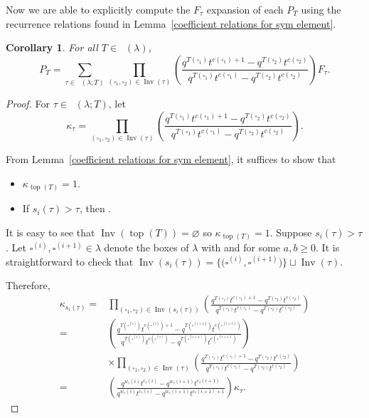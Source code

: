 \documentclass[10pt,a4paper]{amsart}
\numberwithin{equation}{section}
\newtheorem{Corollary}[Theorem]{Corollary}
\theoremstyle{definition}
\DeclareMathOperator{\PSYT}{\mathrm{PSYT}_{\geq 0}}
\DeclareMathOperator{\RSSYT}{\mathrm{RSSYT}_{\geq 0}}
\DeclareMathOperator{\Inv}{\mathrm{Inv}}
\DeclareMathOperator{\Top}{\mathrm{top}}
\begin{document}
Now we are able to explicitly compute the $F_{\tau}$ expansion of each $P_{T}$ using the recurrence relations found in Lemma~\ref{coefficient relations for sym element}.

\begin{Corollary}\label{expansion of sym into nonsym}
 For all $T\in \RSSYT(\lambda)$,
 \[
 P_T = \sum_{\tau \in \PSYT(\lambda;T)} \prod_{(\square_1,\square_2) \in \Inv(\tau)} \left( \frac{q^{T(\square_1)}t^{c(\square_1) +1} - q^{T(\square_2)}t^{c(\square_2) }}{q^{T(\square_1)}t^{c(\square_1)} - q^{T(\square_2)}t^{c(\square_2)}} \right) F_{\tau}.
 \]

\end{Corollary}
\begin{proof}
 For $\tau \in \PSYT(\lambda;T)$, let
 \[
 \kappa_{\tau}= \prod_{(\square_1,\square_2) \in \Inv(\tau)} \left( \frac{q^{T(\square_1)}t^{c(\square_1) +1} - q^{T(\square_2)}t^{c(\square_2) }}{q^{T(\square_1)}t^{c(\square_1)} - q^{T(\square_2)}t^{c(\square_2)}} \right).
 \]

 {\samepage From Lemma~\ref{coefficient relations for sym element}, it suffices to show that
 \begin{itemize}
\itemsep=0pt
 \item $\kappa_{\Top(T)} = 1$.
 \item If $s_i(\tau) > \tau$, then .
 \end{itemize}}

 It is easy to see that $\Inv(\Top(T)) = \varnothing$ so $\kappa_{\Top(T)} = 1$. Suppose $s_i(\tau) > \tau$. Let $\square^{(i)},\square^{(i+1)} \in \lambda$ denote the boxes of $\lambda$ with  and  for some $a,b \geq 0$. It is straightforward to check that
$
 \Inv(s_i(\tau)) = \big\{\bigl(\square^{(i)},\square^{(i+1)}\bigr)\big\} \sqcup \Inv(\tau)$.


 Therefore,
 \begin{align*}
 \kappa_{s_i(\tau)} ={}& \prod_{(\square_1,\square_2) \in \Inv(s_i(\tau))} \left( \frac{q^{T(\square_1)}t^{c(\square_1) +1} - q^{T(\square_2)}t^{c(\square_2) }}{q^{T(\square_1)}t^{c(\square_1)} - q^{T(\square_2)}t^{c(\square_2)}} \right) \\
 = {}&\left( \frac{q^{T(\square^{(i)})}t^{c(\square^{(i)}) +1} - q^{T(\square^{(i+1)})}t^{c(\square^{(i+1)}) }}{q^{T(\square^{(i)})}t^{c(\square^{(i)})} - q^{T(\square^{(i+1)})}t^{c(\square^{(i+1)})}} \right) \\
 &\times\prod_{(\square_1,\square_2) \in \Inv(\tau)} \left( \frac{q^{T(\square_1)}t^{c(\square_1) +1} - q^{T(\square_2)}t^{c(\square_2) }}{q^{T(\square_1)}t^{c(\square_1)} - q^{T(\square_2)}t^{c(\square_2)}} \right) \\
 ={}& \left( \frac{q^{w_{\tau}(i)}t^{c_{\tau}(i)} - q^{w_{\tau}(i+1)}t^{c_{\tau}(i+1)}}{q^{w_{\tau}(i)}t^{c_{\tau}(i)} - q^{w_{\tau}(i+1)}t^{c_{\tau}(i+1)+1}} \right) \kappa_{\tau}.\tag*{\qed}
 \end{align*}\renewcommand{\qed}{}
\end{proof}
\end{document}
